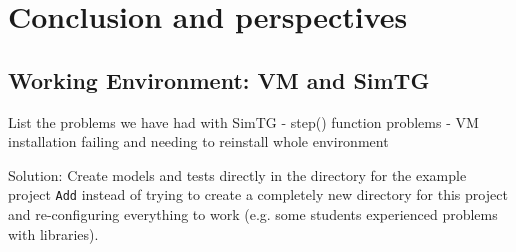 \section{Conclusion and perspectives}
\label{sec:conclusion}



\subsection{Working Environment: VM and SimTG}

List the problems we have had with SimTG
- step() function problems
- VM installation failing and needing to reinstall whole environment

Solution: Create models and tests directly in the directory for the example project \texttt{Add} instead of trying to create a completely new directory for this project and re-configuring everything to work (e.g. some students experienced problems with libraries).
